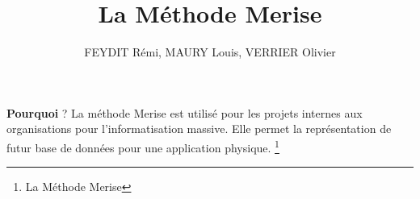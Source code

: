 \documentclass{beamer}
\begin{document}
\begin{frame}{\textbf{Pourquoi} ?}
La méthode Merise est utilisé pour les projets internes aux organisations pour l’informatisation massive.
Elle permet la représentation de futur base de données pour une application physique.
\footnote{La Méthode Merise}
\end{frame}

\begin{frame}
\title{La Méthode Merise}
\author{FEYDIT Rémi, MAURY Louis, VERRIER Olivier}
\titlepage
\end{frame}
\end{document}
